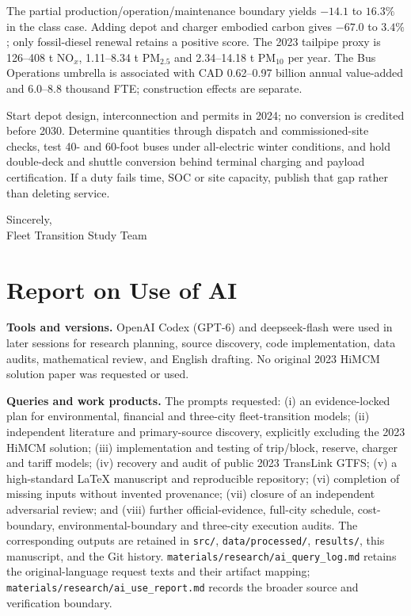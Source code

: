 \documentclass[12pt,letterpaper]{article}
\begin{document}
The partial production/operation/maintenance boundary yields $-14.1$ to $16.3\%$ in the class case. Adding depot and charger embodied carbon gives $-67.0$ to $3.4\%$; only fossil-diesel renewal retains a positive score. The 2023 tailpipe proxy is 126--408 t NO$_x$, 1.11--8.34 t PM$_{2.5}$ and 2.34--14.18 t PM$_{10}$ per year. The Bus Operations umbrella is associated with CAD 0.62--0.97 billion annual value-added and 6.0--8.8 thousand FTE; construction effects are separate.

Start depot design, interconnection and permits in 2024; no conversion is credited before 2030. Determine quantities through dispatch and commissioned-site checks, test 40- and 60-foot buses under all-electric winter conditions, and hold double-deck and shuttle conversion behind terminal charging and payload certification. If a duty fails time, SOC or site capacity, publish that gap rather than deleting service.

Sincerely,\\
Fleet Transition Study Team

\newpage
\section*{Report on Use of AI}
\textbf{Tools and versions.} OpenAI Codex (GPT-6) and deepseek-flash were used in later sessions for research planning, source discovery, code implementation, data audits, mathematical review, and English drafting. No original 2023 HiMCM solution paper was requested or used.\cite{aicodex}

\textbf{Queries and work products.} The prompts requested: (i) an evidence-locked plan for environmental, financial and three-city fleet-transition models; (ii) independent literature and primary-source discovery, explicitly excluding the 2023 HiMCM solution; (iii) implementation and testing of trip/block, reserve, charger and tariff models; (iv) recovery and audit of public 2023 TransLink GTFS; (v) a high-standard LaTeX manuscript and reproducible repository; (vi) completion of missing inputs without invented provenance; (vii) closure of an independent adversarial review; and (viii) further official-evidence, full-city schedule, cost-boundary, environmental-boundary and three-city execution audits. The corresponding outputs are retained in \texttt{src/}, \texttt{data/processed/}, \texttt{results/}, this manuscript, and the Git history. \nolinkurl{materials/research/ai_query_log.md} retains the original-language request texts and their artifact mapping; \nolinkurl{materials/research/ai_use_report.md} records the broader source and verification boundary.
\end{document}
